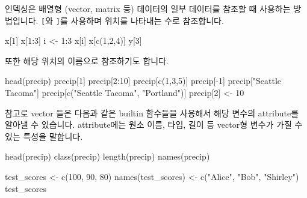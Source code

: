 \documentclass[
]{book}
\newenvironment{Shaded}{\begin{snugshade}}{\end{snugshade}}
\newcommand{\DecValTok}[1]{\textcolor[rgb]{0.00,0.00,0.81}{#1}}
\newcommand{\FunctionTok}[1]{\textcolor[rgb]{0.00,0.00,0.00}{#1}}
\newcommand{\NormalTok}[1]{#1}
\newcommand{\OtherTok}[1]{\textcolor[rgb]{0.56,0.35,0.01}{#1}}
\newcommand{\SpecialCharTok}[1]{\textcolor[rgb]{0.00,0.00,0.00}{#1}}
\newcommand{\StringTok}[1]{\textcolor[rgb]{0.31,0.60,0.02}{#1}}
\begin{document}
인덱싱은 배열형 (vector, matrix 등) 데이터의 일부 데이터를 참조할 때 사용하는 방법입니다. \texttt{{[}}와 \texttt{{]}}를 사용하며 위치를 나타내는 수로 참조합니다.

\begin{Shaded}
\begin{Highlighting}[]
\NormalTok{x[}\DecValTok{1}\NormalTok{]}
\NormalTok{x[}\DecValTok{1}\SpecialCharTok{:}\DecValTok{3}\NormalTok{]}
\NormalTok{i }\OtherTok{\textless{}{-}} \DecValTok{1}\SpecialCharTok{:}\DecValTok{3}
\NormalTok{x[i]}
\NormalTok{x[}\FunctionTok{c}\NormalTok{(}\DecValTok{1}\NormalTok{,}\DecValTok{2}\NormalTok{,}\DecValTok{4}\NormalTok{)]}
\NormalTok{y[}\DecValTok{3}\NormalTok{]}
\end{Highlighting}
\end{Shaded}

또한 해당 위치의 이름으로 참조하기도 합니다.

\begin{Shaded}
\begin{Highlighting}[]
\FunctionTok{head}\NormalTok{(precip)}
\NormalTok{precip[}\DecValTok{1}\NormalTok{]}
\NormalTok{precip[}\DecValTok{2}\SpecialCharTok{:}\DecValTok{10}\NormalTok{]}
\NormalTok{precip[}\FunctionTok{c}\NormalTok{(}\DecValTok{1}\NormalTok{,}\DecValTok{3}\NormalTok{,}\DecValTok{5}\NormalTok{)]}
\NormalTok{precip[}\SpecialCharTok{{-}}\DecValTok{1}\NormalTok{]}
\NormalTok{precip[}\StringTok{"Seattle Tacoma"}\NormalTok{]}
\NormalTok{precip[}\FunctionTok{c}\NormalTok{(}\StringTok{"Seattle Tacoma"}\NormalTok{, }\StringTok{"Portland"}\NormalTok{)]}
\NormalTok{precip[}\DecValTok{2}\NormalTok{] }\OtherTok{\textless{}{-}} \DecValTok{10}
\end{Highlighting}
\end{Shaded}

참고로 vector 들은 다음과 같은 builtin 함수들을 사용해서 해당 변수의 attribute를 알아낼 수 있습니다. attribute에는 원소 이름, 타입, 길이 등 vector형 변수가 가질 수 있는 특성을 말합니다.

\begin{Shaded}
\begin{Highlighting}[]
\FunctionTok{head}\NormalTok{(precip)}
\FunctionTok{class}\NormalTok{(precip)}
\FunctionTok{length}\NormalTok{(precip)}
\FunctionTok{names}\NormalTok{(precip)}

\NormalTok{test\_scores }\OtherTok{\textless{}{-}} \FunctionTok{c}\NormalTok{(}\DecValTok{100}\NormalTok{, }\DecValTok{90}\NormalTok{, }\DecValTok{80}\NormalTok{)}
\FunctionTok{names}\NormalTok{(test\_scores) }\OtherTok{\textless{}{-}} \FunctionTok{c}\NormalTok{(}\StringTok{"Alice"}\NormalTok{, }\StringTok{"Bob"}\NormalTok{, }\StringTok{"Shirley"}\NormalTok{)}
\NormalTok{test\_scores}
\end{Highlighting}
\end{Shaded}
\end{document}
